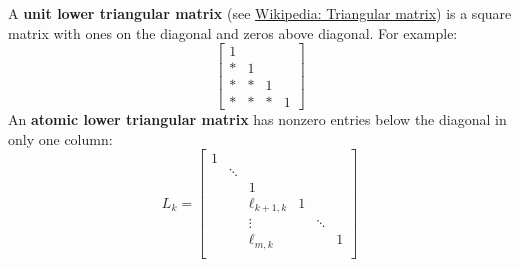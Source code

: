 \begin{definition}
A {\bf unit lower triangular matrix} (see \href{https://en.wikipedia.org/wiki/Triangular_matrix}{Wikipedia: Triangular matrix}) is a square matrix with ones on the diagonal and zeros above diagonal. For example:
$$
\begin{bmatrix} 1 & & \\ * & 1 & & \\ * & * & 1 & \\ * & * & * & 1 \end{bmatrix}
$$
An {\bf atomic lower triangular matrix} has nonzero entries below the diagonal in only one column:
$$
L_k =
\begin{bmatrix}
1 & & & & & \\
 & \ddots & & & & \\
 & & 1 & & & \\
 & & \ell_{k+1,k}& 1 & & \\
 & & \vdots & & \ddots & \\
 & & \ell_{m,k} & & & 1 \\
\end{bmatrix}
$$
\end{definition}

